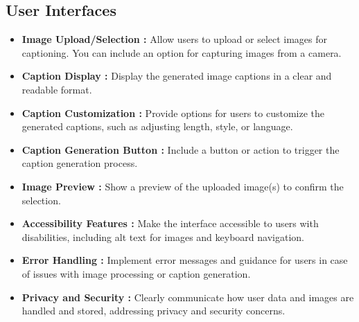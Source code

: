 \documentclass[oneside,a4paper,12pt]{report}
\begin{document}
\subsection{User Interfaces}
\begin{itemize}
\item \textbf{Image Upload/Selection : }Allow users to upload or select images for captioning. You can include an option for capturing images from a camera.
\item \textbf{Caption Display :} Display the generated image captions in a clear and readable format.
\item\textbf{ Caption Customization :} Provide options for users to customize the generated captions, such as adjusting length, style, or language.
\item \textbf{Caption Generation Button :} Include a button or action to trigger the caption generation process.
\item \textbf{Image Preview :} Show a preview of the uploaded image(s) to confirm the selection.
\item \textbf{Accessibility Features : }Make the interface accessible to users with disabilities, including alt text for images and keyboard navigation.
\item\textbf{ Error Handling : }Implement error messages and guidance for users in case of issues with image processing or caption generation.
\item \textbf{Privacy and Security : }Clearly communicate how user data and images are handled and stored, addressing privacy and security concerns.


\end{itemize}
\end{document}
